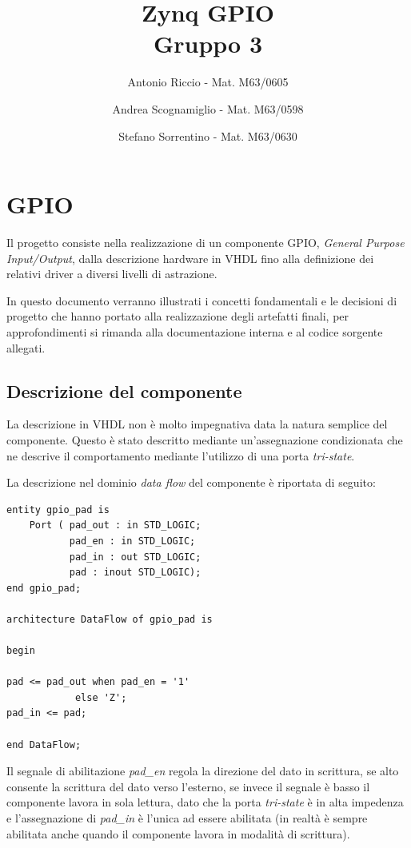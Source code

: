 \documentclass[12pt,a4paper,twoside,openany]{book}
\author{Antonio Riccio - Mat. M63/0605
\and Andrea Scognamiglio - Mat. M63/0598
\and Stefano Sorrentino - Mat. M63/0630}
\title{Zynq GPIO \\ Gruppo 3}
\begin{document}
\frontmatter
\maketitle
\setcounter{page}{1}
\mainmatter
\chapter*{GPIO}
Il progetto consiste  nella realizzazione di un componente GPIO, \textit{General Purpose Input/Output},  dalla descrizione hardware in VHDL fino alla definizione dei relativi driver a diversi livelli di astrazione.

In questo documento verranno illustrati i concetti fondamentali e le decisioni di progetto che hanno portato alla realizzazione degli artefatti finali, per approfondimenti si rimanda alla documentazione interna e al codice sorgente allegati. 

\section*{Descrizione del componente}
La descrizione in VHDL non è molto impegnativa data la natura semplice del componente. Questo è stato descritto mediante un'assegnazione condizionata che ne descrive il comportamento mediante l'utilizzo di una porta \textit{tri-state}. 

La descrizione nel dominio \textit{data flow} del componente  è riportata di seguito:
\begin{lstlisting}[caption={componente GPIO}, label={}, captionpos=b]
entity gpio_pad is
    Port ( pad_out : in STD_LOGIC; 
           pad_en : in STD_LOGIC;  
           pad_in : out STD_LOGIC; 
           pad : inout STD_LOGIC); 
end gpio_pad;

architecture DataFlow of gpio_pad is

begin

pad <= pad_out when pad_en = '1'
       		else 'Z';
pad_in <= pad;

end DataFlow;
\end{lstlisting}

Il segnale di abilitazione \textit{pad\_en} regola la direzione del dato in scrittura, se alto consente la scrittura del dato verso l'esterno, se invece il segnale è basso il componente lavora in sola lettura, dato che la porta \textit{tri-state} è in alta impedenza e l'assegnazione di \textit{pad\_in} è l'unica ad essere abilitata (in realtà è sempre abilitata anche quando il componente lavora in modalità di scrittura).
\clearpage
\end{document}
